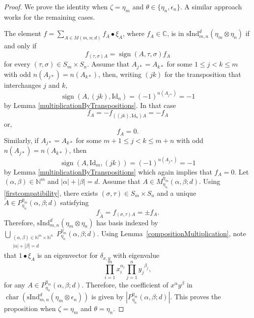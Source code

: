 \documentclass[12pt,reqno]{amsart}
\theoremstyle{definition}
\theoremstyle{remark}
\newcommand{\ind}{\mathrm{sInd}_{m,n}^{d}}
\DeclareMathOperator{\ch}{char}
\DeclareMathOperator{\sign}{sign}
\begin{document}
\begin{proof}
We prove the identity when $\zeta=\eta_{m}$ and $\theta\in\{\eta_{n},\epsilon_{n}\}$. A similar approach works for the remaining cases. 

The element $f= \sum_{A\in M(m,n;d)}f_{A}\bullet\xi_{A}$, where $f_{A}\in\mathbb{C}$, is in  $\ind(\eta_{m}\otimes \eta_{n})$ if and only if
\begin{equation}\label{firstcompatibility}
    f_{(\tau,\sigma)A}=\sign(A,\tau,\sigma)f_{A}
\end{equation}
for every $(\tau,\sigma)\in S_m\times S_n$. Assume that $A_{j*}=A_{k*}$ for some $1\leq j<k\leq m$ with odd $n(A_{j*})=n(A_{k*})$, then,  writing $(jk)$ for the transposition that interchanges $j$ and $k$, $$\sign(A,(jk),\mathrm{Id}_{n})=(-1)^{n(A_{j*})}=-1$$ by Lemma \ref{multiplicationByTranspositions}. In that case $$f_{A}=-f_{((jk),\mathrm{Id}_{n})A}=-f_{A}$$ or, $$f_{A}=0.$$ Similarly, if $A_{j*}=A_{k*}$ for some $m+1\leq j<k\leq m+n$ with odd $n(A_{j*})=n(A_{k*})$, then
$$\sign(A,\mathrm{Id}_{m},(jk))=(-1)^{n(A_{j*})}=-1$$ 
by Lemma \ref{multiplicationByTranspositions} which again implies that $f_{A}=0$. Let $(\alpha,\beta)\in\mathbb{N}^{m}$ and $|\alpha|+|\beta|=d$. Assume that $A\in M^{\eta_{m}}_{\eta_{n}}(\alpha,\beta;d)$. Using \eqref{firstcompatibility}, there exists $(\sigma,\tau)\in S_{m}\times S_n$ and a unique $\tilde{A}\in P^{\eta_{m}}_{\eta_{n}}(\alpha,\beta;d)$ satisfying
$$f_{\tilde{A}}=f_{(\sigma,\tau)A}=\pm f_{A}.$$
Therefore, $\ind(\eta_{m}\otimes \eta_{n})$ has basis indexed by $\bigcup_{\substack{(\alpha,\beta)\in\mathbb{N}^{m}\times\mathbb{N}^{n}\\|\alpha|+|\beta|=d}}P^{\eta_{m}}_{\eta_{n}}(\alpha,\beta;d)$. Using Lemma~\ref{compositionMultiplication}, note that $1\bullet \xi_{A}$ is an eigenvector for $\delta_{x,y}$ with eigenvalue $$\prod_{i=1}^{m}x_{i}^{\alpha_{i}}\prod_{j=1}^{n}{y_{j}}^{\beta_{j}},$$ for any $A\in P^{\eta_{m}}_{\eta_{n}}(\alpha,\beta;d)$. Therefore, the coefficient of $x^{\alpha}y^{\beta}$ in $\ch(\ind(\eta_{m}\otimes \epsilon_{n}))$ is given by $|P^{\eta_{m}}_{\eta_{n}}(\alpha,\beta;d)|$. This proves the proposition when $\zeta=\eta_{m}$ and $\theta=\eta_{n}$.


\end{proof}
\end{document}
